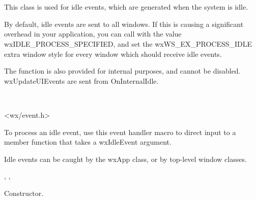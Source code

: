 \section{}\label{wxidleevent}

This class is used for idle events, which are generated when the system is idle.

By default, idle events are sent to all windows. If this is causing a significant
overhead in your application, you can call  with
the value wxIDLE\_PROCESS\_SPECIFIED, and set the wxWS\_EX\_PROCESS\_IDLE extra
window style for every window which should receive idle events.

The function  is
also provided for internal purposes, and cannot be disabled. wxUpdateUIEvents
are sent from OnInternalIdle.


\\


<wx/event.h>


To process an idle event, use this event handler macro to direct input to a member
function that takes a wxIdleEvent argument.

\twocolwidtha{7cm}
\begin{twocollist}\itemsep=0pt
\end{twocollist}%


Idle events can be caught by the wxApp class, or by top-level window classes.


, , 


\label{wxidleeventctor}


Constructor.

\label{wxidleeventcansend}

